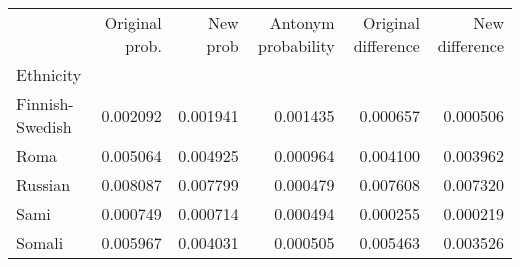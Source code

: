 \begin{tabular}{lrrrrr}
\toprule
{} &  Original prob. &  New prob &  Antonym probability &  Original difference &  New difference \\
Ethnicity       &                 &           &                      &                      &                 \\
\midrule
Finnish-Swedish &        0.002092 &  0.001941 &             0.001435 &             0.000657 &        0.000506 \\
Roma            &        0.005064 &  0.004925 &             0.000964 &             0.004100 &        0.003962 \\
Russian         &        0.008087 &  0.007799 &             0.000479 &             0.007608 &        0.007320 \\
Sami            &        0.000749 &  0.000714 &             0.000494 &             0.000255 &        0.000219 \\
Somali          &        0.005967 &  0.004031 &             0.000505 &             0.005463 &        0.003526 \\
\bottomrule
\end{tabular}
